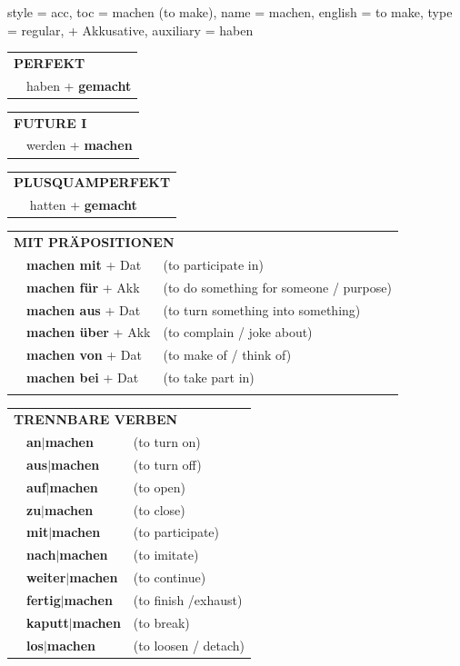 \begin{verbentry}{
  style = {acc},
  toc = {machen (to make)},
  name = {machen},
  english = {to make},
  type = {regular, + Akkusative},
  auxiliary = {haben}
}
 \begin{tabular}{rl}
     \multicolumn{2}{l}{\textbf{PERFEKT}}\\
   & haben + \textbf{gemacht}\\
  \end{tabular}
\hfill
   \begin{tabular}{rl}
   
    \multicolumn{2}{l}{\textbf{FUTURE I} }\\
   & werden + \textbf{machen}\\
 
  \end{tabular}
\hfill
   \begin{tabular}{rl}
      \multicolumn{2}{l}{\textbf{PLUSQUAMPERFEKT}}\\
   & hatten + \textbf{gemacht}\\
  \end{tabular}
  

  \vspace{10pt}

   \begin{tabular}{lll}
      \multicolumn{3}{l}{\textbf{MIT PRÄPOSITIONEN}}\\
& \textbf{machen mit} + Dat & (to participate in)\\
& \textbf{machen für} + Akk & (to do something for someone / purpose)\\
&\textbf{machen aus} + Dat & (to turn something into something)\\
&\textbf{machen über} + Akk & (to complain / joke about)\\
&\textbf{machen von} + Dat & (to make of / think of)\\
&\textbf{machen bei} + Dat & (to take part in)\\
\vspace{40pt}
  \end{tabular}
  \hfill
   \begin{tabular}{lll}
      \multicolumn{3}{l}{\textbf{TRENNBARE VERBEN}}\\
 & \textbf{an$|$machen} & (to turn on)\\
 & \textbf{aus$|$machen} & (to turn off)\\
 & \textbf{auf$|$machen} & (to open)\\
  & \textbf{zu$|$machen} & (to close)\\
  & \textbf{mit$|$machen} & (to participate)\\
  & \textbf{nach$|$machen} & (to imitate)\\
  & \textbf{weiter$|$machen} & (to continue)\\
     & \textbf{fertig$|$machen} & (to finish /exhaust)\\
     & \textbf{kaputt$|$machen} & (to break)\\
     & \textbf{los$|$machen} & (to loosen / detach)\\
  \end{tabular}


  \vspace{-5pt}
\end{verbentry}

